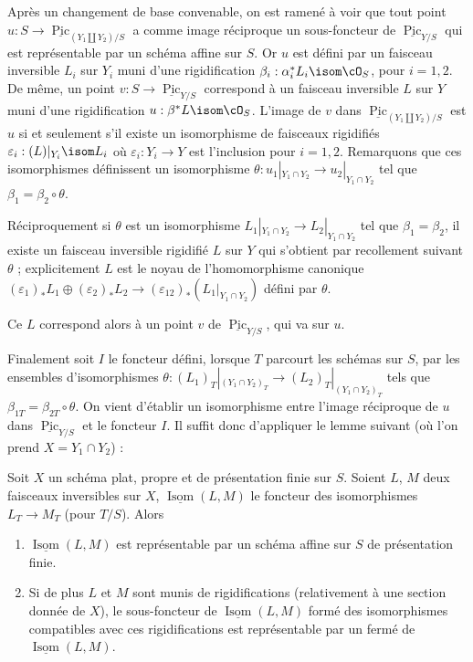 \noindent
Après un changement de base convenable, on est ramené à voir que tout point $u : S \to \underline{\operatorname{Pic}}_{(Y_1 \amalg Y_2)/S}$ a comme image réciproque un sous-foncteur de $\underline{\operatorname{Pic}}_{Y/S}$ qui est représentable par un schéma affine sur $S$. Or $u$ est défini par un faisceau inversible $L_i$ sur $Y_i$ muni d'une rigidification $\beta_i : \alpha_i^* L_i \isom \cO_S$, pour $i=1,2$. De même, un point $v : S \to \underline{\operatorname{Pic}}_{Y/S}$ correspond à un faisceau inversible $L$ sur $Y$ muni d'une rigidification $u : \beta^* L \isom \cO_S$. L'image de $v$ dans $\underline{\operatorname{Pic}}_{(Y_1 \amalg Y_2)/S}$ est $u$ si et seulement s'il existe un isomorphisme de faisceaux rigidifiés $\varepsilon_i : (L)|_{Y_i} \isom L_i$ où $\varepsilon_i : Y_i \to Y$ est l'inclusion pour $i=1,2$. Remarquons que ces isomorphismes définissent un isomorphisme $\theta : u_1|_{Y_1 \cap Y_2} \to u_2|_{Y_1 \cap Y_2}$ tel que $\beta_1 = \beta_2 \circ \theta$.

Réciproquement si $\theta$ est un isomorphisme $L_1|_{Y_1 \cap Y_2} \to L_2|_{Y_1 \cap Y_2}$ tel que $\beta_1 = \beta_2$, il existe un faisceau inversible rigidifié $L$ sur $Y$ qui s'obtient par recollement suivant $\theta$ ; explicitement $L$ est le noyau de l'homomorphisme canonique $(\varepsilon_1)_* L_1 \oplus (\varepsilon_2)_* L_2 \to (\varepsilon_{12})_* (L_1|_{Y_1 \cap Y_2})$ défini par $\theta$.

Ce $L$ correspond alors à un point $v$ de $\underline{\operatorname{Pic}}_{Y/S}$, qui va sur $u$.

Finalement soit $I$ le foncteur défini, lorsque $T$ parcourt les schémas sur $S$, par les ensembles d'isomorphismes $\theta : (L_1)_T|_{(Y_1 \cap Y_2)_T} \to (L_2)_T|_{(Y_1 \cap Y_2)_T}$ tels que $\beta_{1T} = \beta_{2T} \circ \theta$. On vient d'établir un isomorphisme entre l'image réciproque de $u$ dans $\underline{\operatorname{Pic}}_{Y/S}$ et le foncteur $I$. Il suffit donc d'appliquer le lemme suivant (où l'on prend $X = Y_1 \cap Y_2$) :

\begin{lem}\label{lem:2.4} Soit $X$ un schéma plat, propre et de présentation finie sur $S$. Soient $L$, $M$ deux faisceaux inversibles sur $X$, $\underline{\operatorname{Isom}}(L,M)$ le foncteur des isomorphismes $L_T \to M_T$ (pour $T/S$). Alors
\begin{enumerate}[label={\roman*)}]
\item $\underline{\operatorname{Isom}}(L,M)$ est représentable par un schéma affine sur $S$ de présentation finie.
\item Si de plus $L$ et $M$ sont munis de rigidifications (relativement à une section donnée de $X$), le sous-foncteur de $\underline{\operatorname{Isom}}(L,M)$ formé des isomorphismes compatibles avec ces rigidifications est représentable par un fermé de $\underline{\operatorname{Isom}}(L,M)$.
\end{enumerate}
\end{lem}

